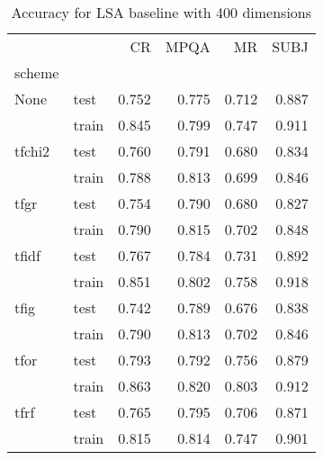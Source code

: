 \begin{table}[h]
\begin{center}

\begin{tabular}{llrrrr}
\toprule
{} &      &  CR &  MPQA &  MR &  SUBJ \\
scheme &  &            &              &            &              \\
\midrule
None & test &      0.752 &        0.775 &      0.712 &        0.887 \\
{} & train &      0.845 &        0.799 &      0.747 &        0.911 \\
tfchi2 & test &      0.760 &        0.791 &      0.680 &        0.834 \\
{} & train &      0.788 &        0.813 &      0.699 &        0.846 \\
tfgr & test &      0.754 &        0.790 &      0.680 &        0.827 \\
{} & train &      0.790 &        0.815 &      0.702 &        0.848 \\
tfidf & test &      0.767 &        0.784 &      0.731 &        0.892 \\
{} & train &      0.851 &        0.802 &      0.758 &        0.918 \\
tfig & test &      0.742 &        0.789 &      0.676 &        0.838 \\
{} & train &      0.790 &        0.813 &      0.702 &        0.846 \\
tfor & test &      0.793 &        0.792 &      0.756 &        0.879 \\
{} & train &      0.863 &        0.820 &      0.803 &        0.912 \\
tfrf & test &      0.765 &        0.795 &      0.706 &        0.871 \\
{} & train &      0.815 &        0.814 &      0.747 &        0.901 \\
\bottomrule
\end{tabular}

\caption[Accuracy for LSA baseline with 400 dimensions]{Accuracy for LSA baseline with 400 dimensions}
\label{tab:lsa:resuts:abs:400}
\end{center}
\end{table}





